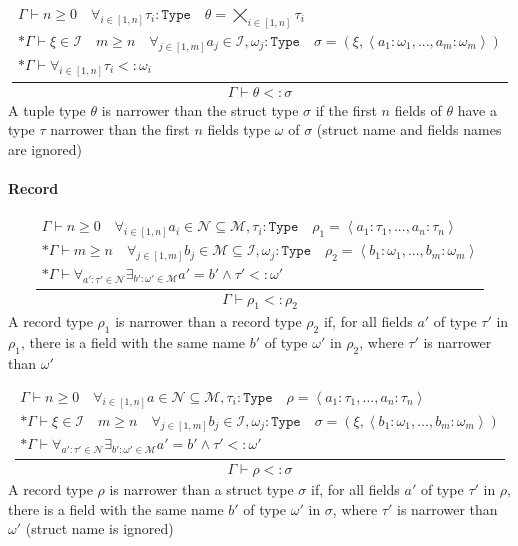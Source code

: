 \documentclass[11pt]{report}
\newcommand{\infrule}[3][gathered]{\frac{\begin{#1}#2\end{#1}}{\begin{gathered}#3\end{gathered}}}
\newcommand{\then}{\vdash}
\newcommand{\tuple}[1]{\left<#1\right>}
\newcommand{\narr}{<:}
\newcommand{\Id}{\mathcal{I}}
\newcommand{\Type}{\texttt{Type}}
\newcommand{\Env}{\Gamma}
\theoremstyle{definition}
\begin{document}
\vspace{\baselineskip}

\[
	\infrule{
		\Env\then n \geq 0 \quad \forall_{i\in[1,n]}{\tau_i:\Type} \quad \theta = \bigtimes_{i \in [1,n]}{\tau_i}\\*
		\Env\then \xi \in \Id \quad m \geq n \quad \forall_{j\in[1,m]}{a_j \in \Id, \omega_j:\Type} \quad \sigma = (\xi, \tuple{a_1:\omega_1,...,a_m:\omega_m}) \\*
		\Env\then \forall_{i \in [1,n]}{\tau_i \narr \omega_i}
	}{
		\Env\then \theta \narr \sigma
	}
\]
A tuple type $\theta$ is narrower than the struct type $\sigma$ if the first
$n$ fields of $\theta$ have a type $\tau$ narrower than the first $n$ fields
type $\omega$ of $\sigma$ (struct name and fields names are ignored)

\vspace{\baselineskip}

\newpage

\paragraph{Record}

\[
	\infrule{
		\Env\then n \geq 0 \quad \forall_{i\in[1,n]}{a_i \in \mathcal{N} \subseteq \mathcal{M}, \tau_i:\Type} \quad \rho_1 = \tuple{a_1:\tau_1,...,a_n:\tau_n} \\*
		\Env\then m \geq n \quad \forall_{j\in[1,m]}{b_j \in \mathcal{M} \subseteq \Id, \omega_j:\Type} \quad \rho_2 = \tuple{b_1:\omega_1,...,b_m:\omega_m} \\*
		\Env\then \forall_{a':\tau'\in\mathcal{N}}{\exists_{b':\omega'\in\mathcal{M}}{a'=b' \land \tau' \narr \omega'}}
	}{
		\Env\then \rho_1 \narr \rho_2
	}
\]
A record type $\rho_1$ is narrower than a record type $\rho_2$ if, for all
fields $a'$ of type $\tau'$ in $\rho_1$, there is a field with the same name
$b'$ of type $\omega'$ in $\rho_2$, where $\tau'$ is narrower than $\omega'$

\vspace{\baselineskip}

\[
	\infrule{
		\Env\then n \geq 0 \quad \forall_{i\in[1,n]}{a \in \mathcal{N} \subseteq \mathcal{M}, \tau_i:\Type} \quad \rho = \tuple{a_1:\tau_1,...,a_n:\tau_n} \\*
		\Env\then \xi \in \Id \quad m \geq n \quad \forall_{j\in[1,m]}{b_j \in \Id, \omega_j:\Type} \quad \sigma = (\xi, \tuple{b_1:\omega_1,...,b_m:\omega_m}) \\*
		\Env\then \forall_{a':\tau'\in\mathcal{N}}{\exists_{b':\omega'\in\mathcal{M}}{a'=b' \land \tau' \narr \omega'}}
	}{
		\Env\then \rho \narr \sigma
	}
\]
A record type $\rho$ is narrower than a struct type $\sigma$ if, for all fields
$a'$ of type $\tau'$ in $\rho$, there is a field with the same name $b'$ of
type $\omega'$ in $\sigma$, where $\tau'$ is narrower than $\omega'$ (struct
name is ignored)
\end{document}
